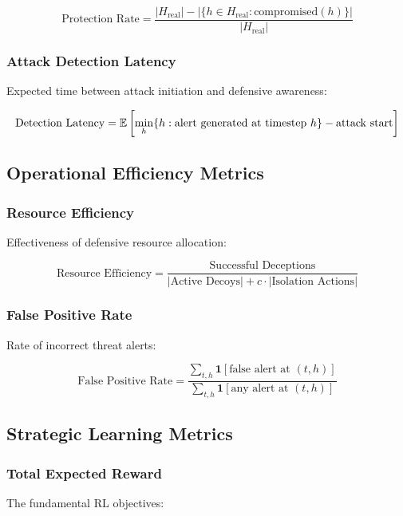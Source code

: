 \documentclass[12pt,twoside]{article}
\theoremstyle{definition}
\theoremstyle{plain}
\begin{document}
\begin{equation}
\text{Protection Rate} = \frac{|H_{\text{real}}| - |\{h \in H_{\text{real}} : \text{compromised}(h)\}|}{|H_{\text{real}}|}
\end{equation}

\subsubsection{Attack Detection Latency}
Expected time between attack initiation and defensive awareness:

\begin{equation}
\text{Detection Latency} = \mathbb{E}\left[\min_h \{h : \text{alert generated at timestep } h\} - \text{attack start}\right]
\end{equation}

\subsection{Operational Efficiency Metrics}

\subsubsection{Resource Efficiency}
Effectiveness of defensive resource allocation:

\begin{equation}
\text{Resource Efficiency} = \frac{\text{Successful Deceptions}}{|\text{Active Decoys}| + c \cdot |\text{Isolation Actions}|}
\end{equation}

\subsubsection{False Positive Rate}
Rate of incorrect threat alerts:

\begin{equation}
\text{False Positive Rate} = \frac{\sum_{t,h} \mathbf{1}[\text{false alert at } (t,h)]}{\sum_{t,h} \mathbf{1}[\text{any alert at } (t,h)]}
\end{equation}

\subsection{Strategic Learning Metrics}

\subsubsection{Total Expected Reward}
The fundamental RL objectives:
\end{document}
